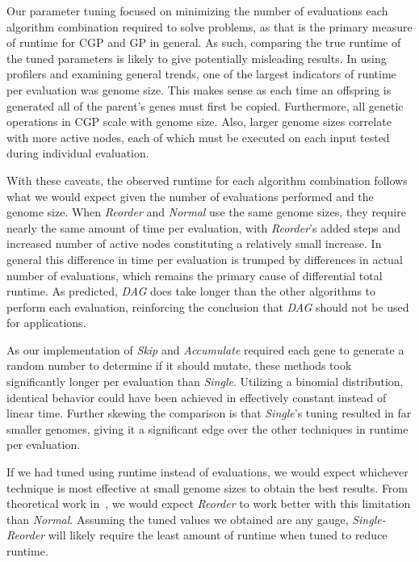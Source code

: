 \documentclass[journal]{IEEEtran}
\begin{document}
Our parameter tuning focused on minimizing the number of evaluations each algorithm
combination required to solve problems, as that is the primary measure of runtime
for CGP and GP in general.  As such, comparing the true runtime of the tuned parameters
is likely to give potentially misleading results.  In using profilers and examining
general trends, one of the largest indicators of runtime per evaluation was genome size.
This makes sense as each time an offspring is generated all of the parent's genes
must first be copied.  Furthermore, all genetic operations in CGP scale with genome size.
Also, larger genome sizes correlate with more active nodes,
each of which must be executed on each input tested during individual evaluation.

With these caveats, the observed runtime for each algorithm combination follows
what we would expect given the number of evaluations performed and the genome size.
When \emph{Reorder} and \emph{Normal} use the same genome sizes, they require
nearly the same amount of time per evaluation, with \emph{Reorder}'s added
steps and increased number of active nodes constituting a relatively small increase.
In general this difference in time per evaluation is trumped by differences in
actual number of evaluations, which remains the primary cause of differential total runtime.
As predicted, \emph{DAG} does take longer than the other algorithms to perform each evaluation,
reinforcing the conclusion that \emph{DAG} should not be used for applications.

As our implementation of \emph{Skip} and \emph{Accumulate} required each gene
to generate a random number to determine if it should mutate, these methods took
significantly longer per evaluation than \emph{Single}.  Utilizing a binomial
distribution, identical behavior could have been achieved in effectively constant
instead of linear time.  Further skewing the comparison is that \emph{Single}'s
tuning resulted in far smaller genomes, giving it a significant edge over the other
techniques in runtime per evaluation.

If we had tuned using runtime instead of evaluations, we would expect whichever
technique is most effective at small genome sizes to obtain the best results.
From theoretical work in~\cite{goldman:2013:ordering}, we would expect \emph{Reorder}
to work better with this limitation than \emph{Normal}.  Assuming the tuned values
we obtained are any gauge, \emph{Single-Reorder} will likely require the least
amount of runtime when tuned to reduce runtime.
\end{document}
